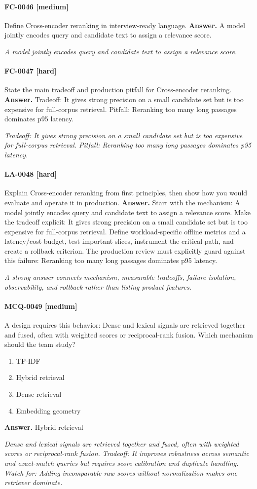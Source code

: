 \paragraph{FC-0046 [medium]} Define Cross-encoder reranking in interview-ready language.
\noindent\textbf{Answer.} A model jointly encodes query and candidate text to assign a relevance score.
\par\textit{A model jointly encodes query and candidate text to assign a relevance score.}
\paragraph{FC-0047 [hard]} State the main tradeoff and production pitfall for Cross-encoder reranking.
\noindent\textbf{Answer.} Tradeoff: It gives strong precision on a small candidate set but is too expensive for full-corpus retrieval. Pitfall: Reranking too many long passages dominates p95 latency.
\par\textit{Tradeoff: It gives strong precision on a small candidate set but is too expensive for full-corpus retrieval. Pitfall: Reranking too many long passages dominates p95 latency.}
\paragraph{LA-0048 [hard]} Explain Cross-encoder reranking from first principles, then show how you would evaluate and operate it in production.
\noindent\textbf{Answer.} Start with the mechanism: A model jointly encodes query and candidate text to assign a relevance score. Make the tradeoff explicit: It gives strong precision on a small candidate set but is too expensive for full-corpus retrieval. Define workload-specific offline metrics and a latency/cost budget, test important slices, instrument the critical path, and create a rollback criterion. The production review must explicitly guard against this failure: Reranking too many long passages dominates p95 latency.
\par\textit{A strong answer connects mechanism, measurable tradeoffs, failure isolation, observability, and rollback rather than listing product features.}
\paragraph{MCQ-0049 [medium]} A design requires this behavior: Dense and lexical signals are retrieved together and fused, often with weighted scores or reciprocal-rank fusion. Which mechanism should the team study?
\begin{enumerate}[label=\Alph*.]
\item TF-IDF
\item Hybrid retrieval
\item Dense retrieval
\item Embedding geometry
\end{enumerate}
\noindent\textbf{Answer.} Hybrid retrieval
\par\textit{Dense and lexical signals are retrieved together and fused, often with weighted scores or reciprocal-rank fusion. Tradeoff: It improves robustness across semantic and exact-match queries but requires score calibration and duplicate handling. Watch for: Adding incomparable raw scores without normalization makes one retriever dominate.}
